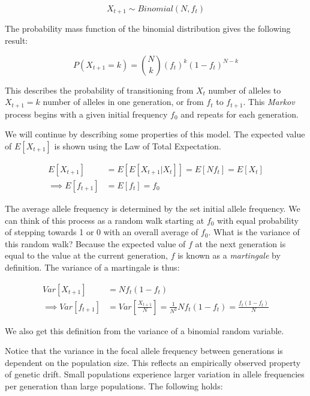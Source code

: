 \begin{equation}
    X_{t+1} \sim Binomial(N,f_t)
\end{equation}

 The probability mass function of the binomial distribution gives the following result:

\begin{equation}
    P(X_{t+1} = k) = {N \choose k}(f_t)^k (1-f_t)^{N-k}
\end{equation}

This describes the probability of transitioning from $X_t$ number of alleles to $X_{t+1} = k$ number of alleles in one generation, or from $f_t$ to $f_{t+1}$. This \textit{Markov} process begins with a given initial frequency $f_0$ and repeats for each generation. 


We will continue by describing some properties of this model. The expected value of $E[X_{t+1}]$ is shown using the Law of Total Expectation.

\begin{equation}
    \begin{split}
            E[X_{t+1}] &= E[E[X_{t+1}|X_{t}]] = E[N f_t] = E[X_t] \\
    \implies E[f_{t+1}] &= E[f_t] = f_0
    \end{split}
\end{equation}


The average allele frequency is determined by the set initial allele frequency. We can think of this process as a random walk starting at $f_0$ with equal probability of stepping towards 1 or 0 with an overall average of $f_0$. What is the variance of this random walk? Because the expected value of $f$ at the next generation is equal to the value at the current generation, $f$ is known as a \textit{martingale} by definition. The variance of a martingale is thus:
 
\begin{equation}
    \begin{split}
            Var[X_{t+1}] &= N f_t(1-f_t) \\
            \implies Var[f_{t+1}] &= Var[\frac{X_{t+1}}{N}] =  \frac{1}{N^2} N f_t(1-f_t) = \frac{f_t (1-f_t)}{N} 
    \end{split}
\end{equation}

We also get this definition from the variance of a binomial random variable. 


Notice that the variance in the focal allele frequency between generations is dependent on the population size. This reflects an empirically observed property of genetic drift. Small populations experience larger variation in allele frequencies per generation than large populations. The following holds:

